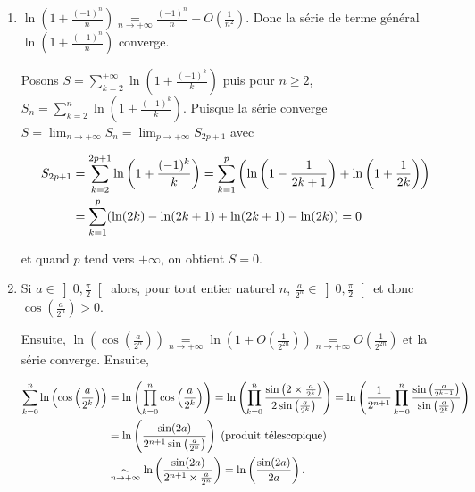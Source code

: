 \documentclass[11pt,a4paper]{article}
\begin{document}
\begin{enumerate}
\item  $\ln\left(1+\frac{(-1)^n}{n}\right)\underset{n\rightarrow+\infty}{=}\frac{(-1)^n}{n}+O\left(\frac{1}{n^2}\right)$. Donc la série de terme général $\ln\left(1+\frac{(-1)^n}{n}\right)$ converge.

Posons $S=\sum_{k=2}^{+\infty}\ln\left(1+\frac{(-1)^k}{k}\right)$ puis pour $n\geqslant2$, $S_n=\sum_{k=2}^{n}\ln\left(1+\frac{(-1)^k}{k}\right)$. Puisque la série converge $S=\lim_{n \rightarrow +\infty}S_n=\lim_{p \rightarrow +\infty}S_{2p+1}$ avec

\begin{align*}\ensuremath
S_{2p+1}&=\sum_{k=2}^{2p+1}\ln\left(1+\frac{(-1)^k}{k}\right)=\sum_{k=1}^{p}\left(\ln\left(1-\frac{1}{2k+1}\right)+\ln\left(1+\frac{1}{2k}\right)\right)\\
 &=\sum_{k=1}^{p}(\ln(2k)-\ln(2k+1)+\ln(2k+1)-\ln(2k))=0
\end{align*}

et quand $p$ tend vers $+\infty$, on obtient $S = 0$.

\begin{center}
\end{center}

\item  Si $a\in\left]0,\frac{\pi}{2}\right[$ alors, pour tout entier naturel $n$, $\frac{a}{2^n}\in\left]0,\frac{\pi}{2}\right[$ et donc $\cos\left(\frac{a}{2^n}\right)>0$.

Ensuite, $\ln\left(\cos\left(\frac{a}{2^n}\right)\right)\underset{n\rightarrow+\infty}{=}\ln\left(1+O\left(\frac{1}{2^{2n}}\right)\right)\underset{n\rightarrow+\infty}{=}O\left(\frac{1}{2^{2n}}\right)$ et la série converge. Ensuite,

\begin{align*}\ensuremath
\sum_{k=0}^{n}\ln\left(\cos\left(\frac{a}{2^k}\right)\right)&=\ln\left(\prod_{k=0}^{n}\cos\left(\frac{a}{2^k}\right)\right)=\ln\left(\prod_{k=0}^{n}\frac{\sin\left(2\times\frac{a}{2^k}\right)}{2\sin\left(\frac{a}{2^k}\right)}\right)=\ln\left(\frac{1}{2^{n+1}}\prod_{k=0}^{n}\frac{\sin\left(\frac{a}{2^{k-1}}\right)}{\sin\left(\frac{a}{2^k}\right)}\right)\\
 &=\ln\left(\frac{\sin(2a)}{2^{n+1}\sin\left(\frac{a}{2^n}\right)}\right)\;(\text{produit télescopique})\\
 &\underset{n\rightarrow+\infty}{\sim}\ln\left(\frac{\sin(2a)}{2^{n+1}\times\frac{a}{2^n}}\right)=\ln\left(\frac{\sin(2a)}{2a}\right).
\end{align*}


\end{enumerate}
\end{document}
